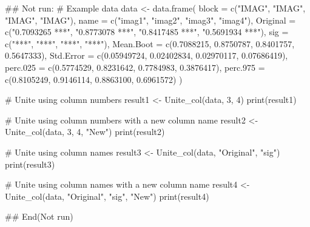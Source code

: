 \documentclass[a4paper]{book}
\begin{document}
\begin{Examples}
\begin{ExampleCode}
\#\# Not run: 
# Example data
data <- data.frame(
  block = c("IMAG", "IMAG", "IMAG", "IMAG"),
  name = c("imag1", "imag2", "imag3", "imag4"),
  Original = c("0.7093265 ***", "0.8773078 ***", "0.8417485 ***", "0.5691934 ***"),
  sig = c("***", "***", "***", "***"),
  Mean.Boot = c(0.7088215, 0.8750787, 0.8401757, 0.5647333),
  Std.Error = c(0.05949724, 0.02402834, 0.02970117, 0.07686419),
  perc.025 = c(0.5774529, 0.8231642, 0.7784983, 0.3876417),
  perc.975 = c(0.8105249, 0.9146114, 0.8863100, 0.6961572)
)

# Unite using column numbers
result1 <- Unite_col(data, 3, 4)
print(result1)

# Unite using column numbers with a new column name
result2 <- Unite_col(data, 3, 4, "New")
print(result2)

# Unite using column names
result3 <- Unite_col(data, "Original", "sig")
print(result3)

# Unite using column names with a new column name
result4 <- Unite_col(data, "Original", "sig", "New")
print(result4)

## End(Not run)
\end{ExampleCode}
\end{Examples}
\end{document}
